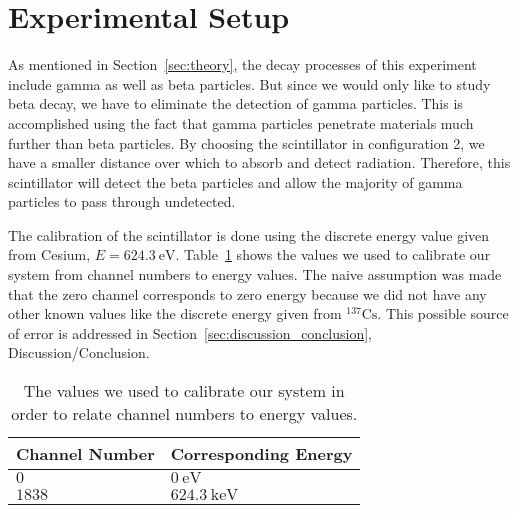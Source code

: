 \section{Experimental Setup} 

\label{sec:experimental_setup} As mentioned in Section~\ref{sec:theory}, the decay processes of this experiment include gamma as well as beta particles. But since we would only like to study beta decay, we have to eliminate the detection of gamma particles. This is accomplished using the fact that gamma particles penetrate materials much further than beta particles. By choosing the scintillator in configuration 2, we have a smaller distance over which to absorb and detect radiation. Therefore, this scintillator will detect the beta particles and allow the majority of gamma particles to pass through undetected. 

The calibration of the scintillator is done using the discrete energy value given from Cesium, $E=624.3~\text{eV}$. Table~\ref{tab:calibrationNumbers} shows the values we used to calibrate our system from channel numbers to energy values.  The naive assumption was made that the zero channel corresponds to zero energy because we did not have any other known values like the discrete energy given from $^{137}\text{Cs}$. This possible source of error is addressed in Section~\ref{sec:discussion_conclusion}, Discussion/Conclusion.
\begin{table}
	[tbp] 
	\begin{center}
		\begin{tabular}
{ll} \toprule Channel Number & Corresponding Energy\\
                \midrule $0$ &        $0~\text{eV}$\\
                      $1838$ &    $624.3~\text{keV}$\\
\bottomrule 
		\end{tabular}
	\end{center}
	\caption{The values we used to calibrate our system in order to relate channel numbers to energy values.} \label{tab:calibrationNumbers} 
\end{table}%


